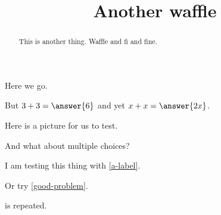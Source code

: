 \documentclass{ximera}
\title{Another waffle}
\begin{document}
\begin{abstract}
  This is another thing.  Waffle and fi and fine.
\end{abstract}
\maketitle

Here we go.

\begin{problem}
  But $3 + 3 = \answer{6}$ and yet $x + x = \answer{2x}$.
\end{problem}

Here is a picture for us to test.


And what about multiple choices?
\begin{problem}
\begin{multipleChoice}
\end{multipleChoice}
\end{problem}

I am testing this thing with \ref{a-label}.

Or try \ref{good-problem}.

\begin{theorem}
  \label{thm:another}
\end{theorem}

\begin{corollary}
  \label{thm:whee} is repeated.
\end{corollary}
\end{document}
